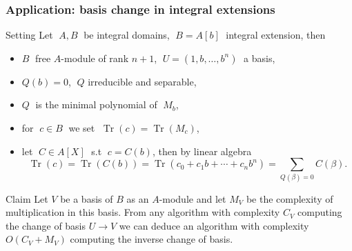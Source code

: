 \documentclass[10pt]{beamer}
\newcommand{\ra}{\rightarrow}
\DeclareMathOperator{\Tr}{Tr}
\begin{document}
\begin{frame}
  \frametitle{Application: basis change in integral extensions}
  
  \begin{block}{Setting}
    Let $\;A, B\;$ be integral domains, $\;B = A[b]\;$ integral extension, then
    \begin{itemize}
    \item $B\;$ free $A$-module of rank $n+1$, $\;U=(1, b, \ldots, b^n)\;$ a basis,
    \item $Q(b) = 0$, $\;Q$ irreducible and separable,
    \item $Q\;$ is the minimal polynomial of $\;M_b$,
    \item for $\;c\in B\;$ we set $\;\Tr(c) = \Tr(M_c)$,
    \item let $\;C\in A[X]\;$ s.t $\;c = C(b)$, then by linear algebra
      \[\Tr(c) = \Tr(C(b)) = \Tr(c_0 + c_1b + \cdots + c_nb^n) =
      \sum_{Q(\beta)=0}C(\beta)
      \text{.}\]
    \end{itemize}
  \end{block}

  \begin{block}{Claim}
    Let $V$ be a basis of $B$ as an $A$-module and let $M_V$ be the
    complexity of multiplication in this basis. From any algorithm
    with complexity $C_V$ computing the change of basis $U\ra V$ we
    can deduce an algorithm with complexity $O(C_V + M_V)$ computing
    the inverse change of basis.
  \end{block}
\end{frame}
\end{document}
